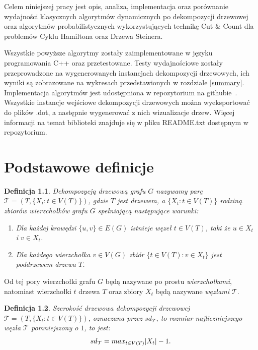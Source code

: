\documentclass[12pt, oneside]{report}
\newtheorem{definition}{Definicja}
\begin{document}
Celem niniejszej pracy jest opis, analiza, implementacja oraz porównanie wydajności klasycznych algorytmów dynamicznych po dekompozycji drzewowej oraz algorytmów probabilistycznych wykorzystujących technikę Cut \& Count dla problemów Cyklu Hamiltona oraz Drzewa Steinera. 

Wszystkie powyższe algorytmy zostały zaimplementowane w języku programowania C++ oraz przetestowane. Testy wydajnościowe zostały przeprowadzone na wygenerowanych instancjach dekompozycji drzewowych, ich wyniki są zobrazowane na wykresach przedstawionych w rozdziale \ref{summary}. Implementacja algorytmów jest udostępniona w repozytorium na githubie~\cite{github}. Wszystkie instancje wejściowe dekompozycji drzewowych można wyeksportować do plików .dot, a następnie wygenerować z nich wizualizacje drzew. Więcej informacji na temat biblioteki znajduje się w pliku README.txt dostępnym w repozytorium.  

\newpage
  	\chapter{Podstawowe definicje}
  	\label{definitions}
	
\begin{definition}
\em \emph{Dekompozycją drzewową grafu} $G$ nazywamy parę $\mathcal{T} = (T, \{X_t : t \in V(T)\})$, gdzie $T$ jest drzewem, a $\{X_t : t \in V(T)\}$ rodziną zbiorów wierzchołków grafu $G$ spełniającą następujące warunki:
\begin{enumerate}[label=(\roman*)]
	\item{Dla każdej krawędzi $\{u, v\} \in E(G)$ istnieje węzeł $t \in V(T)$, taki że $u \in X_t$ i $v \in X_t$.}
	\item{Dla każdego wierzchołka $v \in V(G)$ zbiór $\{t \in V(T): v \in X_t \}$ jest poddrzewem drzewa $T$.}
\end{enumerate}
\end{definition}

Od tej pory wierzchołki grafu $G$ będą nazywane po prostu \emph{wierzchołkami}, natomiast wierzchołki $t$ drzewa $T$ oraz zbiory $X_t$ będą nazywane \emph{węzłami} $\mathcal{T}$.

\begin{definition}
\em \emph{Szerokość drzewowa dekompozycji drzewowej $\mathcal{T}=(T, \{X_t : t \in V(T)\})$}, oznaczana przez $sd_\mathcal{T}$, to rozmiar najliczniejszego węzła $\mathcal{T}$ pomniejszony o $1$, to jest: $$sd_\mathcal{T} = max_{t \in V(T)} \abs{X_t} - 1.$$ 
\end{definition}
\end{document}
